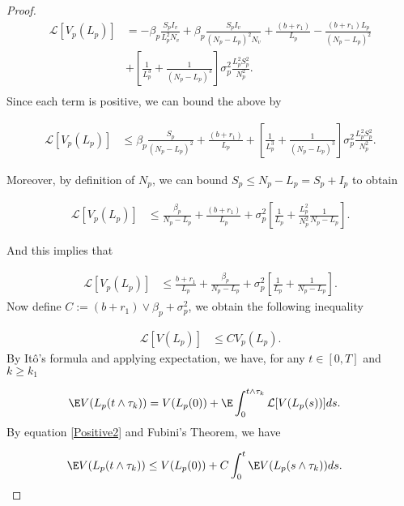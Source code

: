 \begin{proof}
	\begin{align*}
		\mathcal{L}[V_p(L_p)] 
			&=	
				-\beta_p\frac{S_p I_v}{L_p^2 N_v}+\beta_p\frac{S_p I_v}{(N_p -L_p)^2 N_v}+\frac{(b+r_1)}{L_p}-\frac{(b+r_1)L_p}{(N_p-L_p)^2}\\
			&+
				\left[\frac{1}{L_p^3}+\frac{1}{(N_p-L_p)^3}\right]\sigma_p^2\frac{L_p^2 S_p^2}{N_p^2}.\\
	\end{align*}
%	
	Since each term is positive, we can bound the above by
	
	\begin{align*}
		\mathcal{L}[V_p(L_p)] 
			&\leq	
				\beta_p\frac{S_p}{(N_p -L_p)^2}+\frac{(b+r_1)}{L_p}+\left[\frac{1}{L_p^3}+\frac{1}{(N_p-L_p)^3}\right]\sigma_p^2\frac{L_p^2 S_p^2}{N_p^2}.
	\end{align*}
	
	Moreover, by definition of $N_p$, we can bound $S_p\leq N_p-L_p=S_p+I_p$ to obtain
	
	\begin{align*}
		\mathcal{L}[V_p(L_p)] 
			&\leq		
				\frac{\beta_p}{N_p -L_p}+\frac{(b+r_1)}{L_p}+\sigma_p^2\left[\frac{1}{L_p}+\frac{L_p^2}{N_p^2}\frac{1}{N_p-L_p}\right].
	\end{align*}
	
	And this implies that
	
	\begin{align*}
		\mathcal{L}[V_p(L_p)] 
			&\leq		
			\frac{b+r_1}{L_p}+\frac{\beta_p}{N_p -L_p}+\sigma_p^2\left[\frac{1}{L_p}+\frac{1}{N_p-L_p}\right].
	\end{align*}
%	
	Now define $C := (b+r_1) \vee \beta_p +\sigma_p^2$, we obtain the following inequality
	
	\begin{align}\label{Positive2}
		\mathcal{L}[V(L_p)] 
			&\leq		
				C V_p(L_p).
	\end{align}
%
	By It\^{o}'s formula and applying expectation, we have, for any $t \in [0,T]$ and $k\geq k_1$
	
	\begin{align*}
		\E V(L_p(t\wedge\tau_k))&=V(L_p(0))+\E\int_{0}^{t\wedge\tau_k}\mathcal{L}[V(L_p(s))]ds.
	\end{align*}
%
	By equation \eqref{Positive2} and Fubini's Theorem, we have
	
	\begin{align*}
		\E V(L_p(t\wedge\tau_k))&\leq V(L_p(0))+C\int_{0}^{t}\E V(L_p(s\wedge\tau_k))ds.
	\end{align*}
	

\end{proof}
